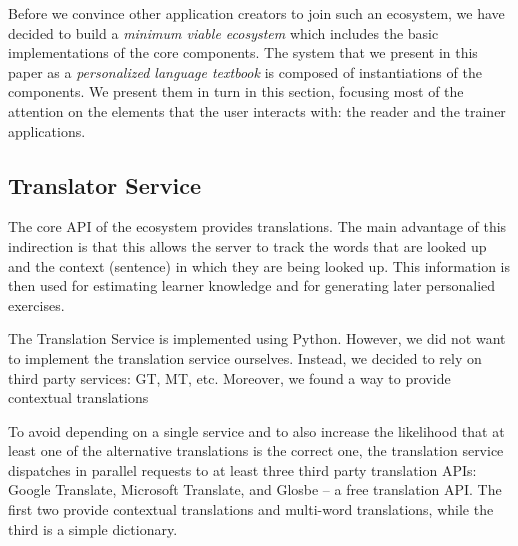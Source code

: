 


Before we convince other application creators to join such an ecosystem, we have decided to build a {\em minimum viable ecosystem} which includes the basic implementations of the core components. The system that we present in this paper as a {\em personalized language textbook} is composed of instantiations of the components. We present them in turn in this section, focusing most of the attention on the elements that the user interacts with: the reader and the trainer applications. 









\subsection{Translator Service}

The core API of the ecosystem provides translations. The main advantage of this indirection is that this allows the server to track the words that are looked up and the context (sentence) in which they are being looked up. This information is then used for estimating learner knowledge and for generating later personalied exercises. 

The Translation Service is implemented using Python. However, we did not want to implement the translation service ourselves. Instead, we decided to rely on third party services: GT, MT, etc. Moreover, we found a way to provide contextual translations 



To avoid depending on a single service and to also increase the likelihood that at least one of the alternative translations is the correct one, the translation service dispatches in parallel requests to at least three third party translation APIs: Google Translate, Microsoft Translate, and Glosbe -- a free translation API. The first two provide contextual translations and multi-word translations, while the third is a simple dictionary. 


